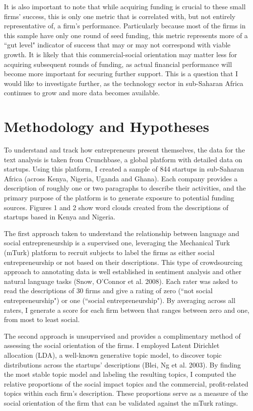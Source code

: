 \documentclass[12pt]{article}
\begin{document}
It is also important to note that while acquiring funding is crucial to these small firms' success, this is only one metric that is correlated with, but not entirely representative of, a firm's performance. Particularly because most of the firms in this sample have only one round of seed funding, this metric represents more of a ``gut level" indicator of success that may or may not correspond with viable growth. It is likely that this commercial-social orientation may matter less for acquiring subsequent rounds of funding, as actual financial performance will become more important for securing further support. This is a question that I would like to investigate further, as the technology sector in sub-Saharan Africa continues to grow and more data becomes available.

\section{Methodology and Hypotheses}

To understand and track how entrepreneurs present themselves, the data for the text analysis is taken from Crunchbase, a global platform with detailed data on startups. Using this platform, I created a sample of 844 startups in sub-Saharan Africa (across Kenya, Nigeria, Uganda and Ghana). Each company provides a description of roughly one or two paragraphs to describe their activities, and the primary purpose of the platform is to generate exposure to potential funding sources. Figures 1 and 2 show word clouds created from the descriptions of startups based in Kenya and Nigeria. 

The first approach taken to understand the relationship between language and social entrepreneurship is a supervised one, leveraging the Mechanical Turk (mTurk) platform to recruit subjects to label the firms as either social entrepreneurship or not based on their descriptions. This type of crowdsourcing approach to annotating data is well established in sentiment analysis and other natural language tasks (Snow, O'Connor et al. 2008). Each rater was asked to read the descriptions of 30 firms and give a rating of zero (``not social entrepreneurship") or one (``social entrepreneurship"). By averaging across all raters, I generate a score for each firm between that ranges between zero and one, from most to least social.  

The second approach is unsupervised and provides a complimentary method of assessing the social orientation of the firms. I employed Latent Dirichlet allocation (LDA), a well-known generative topic model, to discover topic distributions across the startups' descriptions (Blei, Ng et al. 2003). By finding the most stable topic model and labeling the resulting topics, I computed the relative proportions of the social impact topics and the commercial, profit-related topics within each firm's description. These proportions serve as a measure of the social orientation of the firm that can be validated against the mTurk ratings.
\end{document}
